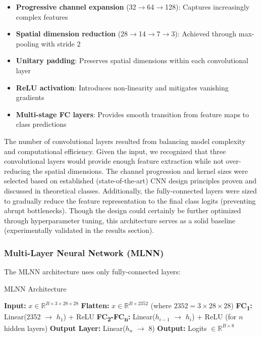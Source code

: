 \documentclass[runningheads]{llncs}
\begin{document}
\begin{itemize}
    \item \textbf{Progressive channel expansion} (32$\rightarrow$64$\rightarrow$128): Captures increasingly complex features
    \item \textbf{Spatial dimension reduction} (28$\rightarrow$14$\rightarrow$7$\rightarrow$3): Achieved through max-pooling with stride 2
    \item \textbf{Unitary padding}: Preserves spatial dimensions within each convolutional layer
    \item \textbf{ReLU activation}: Introduces non-linearity and mitigates vanishing gradients
    \item \textbf{Multi-stage FC layers}: Provides smooth transition from feature maps to class predictions
\end{itemize}

\noindent 
The number of convolutional layers resulted from balancing model complexity and computational efficiency.
Given the input, we recognized that three convolutional layers would provide enough feature extraction while not over-reducing the spatial dimensions.
The channel progression and kernel sizes were selected based on established (state-of-the-art) CNN design principles proven and discussed in theoretical classes.
Additionally, the fully-connected layers were sized to gradually reduce the feature representation to the final class logits (preventing abrupt bottlenecks).
Though the design could certainly be further optimized through hyperparameter tuning, this architecture serves as a solid baseline (experimentally validated in the results section).

\subsubsection{Multi-Layer Neural Network (MLNN)}
The MLNN architecture uses only fully-connected layers:

\begin{algorithm}
\caption{MLNN Architecture}
\begin{algorithmic}[1]
\STATE \textbf{Input:} $x \in \mathbb{R}^{B \times 3 \times 28 \times 28}$
\STATE \textbf{Flatten:} $x \in \mathbb{R}^{B \times 2352}$ (where $2352 = 3 \times 28 \times 28$)
\STATE \textbf{FC\textsubscript{1}:} Linear(2352 $\rightarrow$ $h_1$) + ReLU
\STATE \textbf{FC\textsubscript{2}-FC\textsubscript{n}:} Linear($h_{i-1}$ $\rightarrow$ $h_i$) + ReLU (for $n$ hidden layers)
\STATE \textbf{Output Layer:} Linear($h_n$ $\rightarrow$ 8)
\STATE \textbf{Output:} Logits $\in \mathbb{R}^{B \times 8}$
\end{algorithmic}
\end{algorithm}
\end{document}
